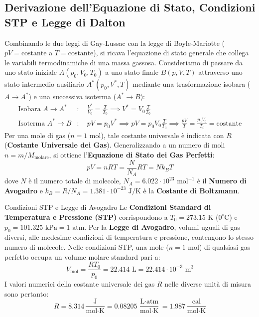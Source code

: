 \subsection{Derivazione dell'Equazione di Stato, Condizioni STP e Legge di Dalton}
Combinando le due leggi di Gay-Lussac con la legge di Boyle-Mariotte ($p V = \text{costante}$ a $T = \text{costante}$), si ricava l'equazione di stato generale che collega le variabili termodinamiche di una massa gassosa. Consideriamo di passare da uno stato iniziale $A(p_0, V_0, T_0)$ a uno stato finale $B(p, V, T)$ attraverso uno stato intermedio ausiliario $A^*(p_0, V^*, T)$ mediante una trasformazione isobara ($A \to A^*$) e una successiva isoterma ($A^* \to B$):
\begin{align}
    \text{Isobara } A \to A^* &: \quad \frac{V^*}{V_0} = \frac{T}{T_0} \implies V^* = V_0 \frac{T}{T_0} \\
    \text{Isoterma } A^* \to B &: \quad p V = p_0 V^* \implies p V = p_0 V_0 \frac{T}{T_0} \implies \frac{p V}{T} = \frac{p_0 V_0}{T_0} = \text{costante}
\end{align}
Per una mole di gas ($n = 1\text{ mol}$), tale costante universale è indicata con $R$ (\textbf{Costante Universale dei Gas}). Generalizzando a un numero di moli $n = m / M_{\text{molare}}$, si ottiene l'\textbf{Equazione di Stato dei Gas Perfetti}:
\begin{equation}
    \boxed{ p V = n R T = \frac{N}{N_A} R T = N k_B T }
\end{equation}
dove $N$ è il numero totale di molecole, $N_A = 6.022 \cdot 10^{23}\text{ mol}^{-1}$ è il \textbf{Numero di Avogadro} e $k_B = R / N_A = 1.381 \cdot 10^{-23}\text{ J/K}$ è la \textbf{Costante di Boltzmann}.

\begin{definizione}{Condizioni STP e Legge di Avogadro}
Le \textbf{Condizioni Standard di Temperatura e Pressione (STP)} corrispondono a $T_0 = 273.15\text{ K}$ ($0^\circ\text{C}$) e $p_0 = 101.325\text{ kPa} = 1\text{ atm}$. 
Per la \textbf{Legge di Avogadro}, volumi uguali di gas diversi, alle medesime condizioni di temperatura e pressione, contengono lo stesso numero di molecole. Nelle condizioni STP, una mole ($n=1\text{ mol}$) di qualsiasi gas perfetto occupa un volume molare standard pari a:
\begin{equation}
    V_{\text{mol}} = \frac{R T_0}{p_0} = 22.414\text{ L} = 22.414 \cdot 10^{-3}\text{ m}^3
\end{equation}
I valori numerici della costante universale dei gas $R$ nelle diverse unità di misura sono pertanto:
\begin{equation}
    R = 8.314 \, \frac{\text{J}}{\text{mol} \cdot \text{K}} = 0.08205 \, \frac{\text{L} \cdot \text{atm}}{\text{mol} \cdot \text{K}} = 1.987 \, \frac{\text{cal}}{\text{mol} \cdot \text{K}}
\end{equation}
\end{definizione}

